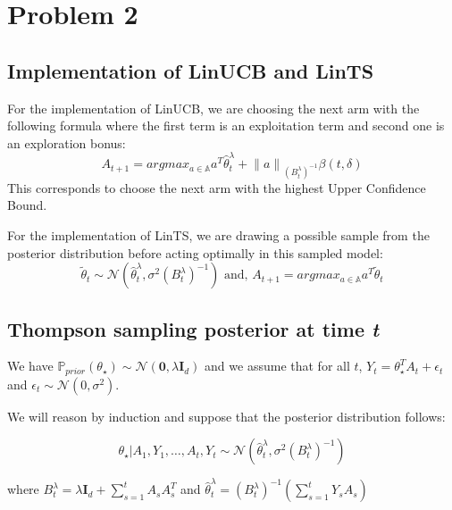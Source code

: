 \section{Problem 2}

\subsection{Implementation of \textbf{LinUCB} and \textbf{LinTS}}
For the implementation of LinUCB, we are choosing the next arm with the following formula where the first term is an exploitation term and 
second one is an exploration bonus:
\[ A_{t+1} = argmax_{a \in \mathbb{A}} a^T \hat \theta_t^{\lambda} + {\lVert a \rVert}_{{(B_t^{\lambda})}^{-1}} \beta(t,\delta) \]
This corresponds to choose the next arm with the highest Upper Confidence Bound.

For the implementation of LinTS, we are drawing a possible sample from the posterior distribution before acting optimally in this sampled model:
\[ \tilde{\theta}_t \sim \mathcal{N}(\hat \theta_t^{\lambda}, 
   \sigma^2{(B_t^{\lambda})}^{-1}) \text{ and, } A_{t+1} = argmax_{a \in \mathbb{A}} a^T \tilde{\theta}_t\]

\subsection{Thompson sampling posterior at time \emph{t}}
We have $\mathbb{P}_{prior}(\theta_{\star}) \sim \mathcal{N}(\mathbf{0}, \lambda \mathbf{I}_d)$ and we assume that for all $t$, $Y_{t} = \theta_{\star}^TA_t + \epsilon_t$ and $\epsilon_t \sim \mathcal{N}(0, \sigma^2)$.

We will reason by induction and suppose that the posterior distribution follows:

\[
\theta_{\star}|A_1, Y_1, \dots, A_t, Y_t \sim \mathcal{N}(\hat\theta_t^{\lambda}, \sigma^2{(B_t^{\lambda})}^{-1})
\]

where $B_t^{\lambda} = \lambda \mathbf{I}_d + \sum_{s=1}^t A_s A_s^T$ and $\hat\theta_t^{\lambda} = {(B_t^{\lambda})}^{-1} (\sum_{s=1}^t Y_s A_s)$

